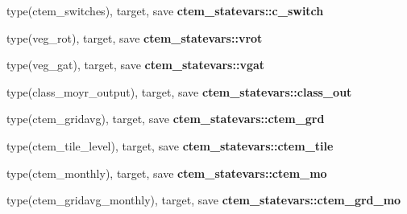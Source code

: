 \begin{DoxyCompactItemize}
\item 
\hypertarget{namespacectem__statevars_ae5b8eaa631db6fcf2adc586a8ffdb722}{}type(ctem\+\_\+switches), target, save {\bfseries ctem\+\_\+statevars\+::c\+\_\+switch}\label{namespacectem__statevars_ae5b8eaa631db6fcf2adc586a8ffdb722}

\item 
\hypertarget{namespacectem__statevars_ac60177625fa0d946b94065134b1f37a2}{}type(veg\+\_\+rot), target, save {\bfseries ctem\+\_\+statevars\+::vrot}\label{namespacectem__statevars_ac60177625fa0d946b94065134b1f37a2}

\item 
\hypertarget{namespacectem__statevars_ae21be54e6097f1f897ddbb5a7265d301}{}type(veg\+\_\+gat), target, save {\bfseries ctem\+\_\+statevars\+::vgat}\label{namespacectem__statevars_ae21be54e6097f1f897ddbb5a7265d301}

\item 
\hypertarget{namespacectem__statevars_a1b383361faf075e17b8f4376d478f469}{}type(class\+\_\+moyr\+\_\+output), target, save {\bfseries ctem\+\_\+statevars\+::class\+\_\+out}\label{namespacectem__statevars_a1b383361faf075e17b8f4376d478f469}

\item 
\hypertarget{namespacectem__statevars_ab8cd13b4bb2133f86012aa72a85253de}{}type(ctem\+\_\+gridavg), target, save {\bfseries ctem\+\_\+statevars\+::ctem\+\_\+grd}\label{namespacectem__statevars_ab8cd13b4bb2133f86012aa72a85253de}

\item 
\hypertarget{namespacectem__statevars_a35e3e81a8d12b67b5bc48767779ffe4d}{}type(ctem\+\_\+tile\+\_\+level), target, save {\bfseries ctem\+\_\+statevars\+::ctem\+\_\+tile}\label{namespacectem__statevars_a35e3e81a8d12b67b5bc48767779ffe4d}

\item 
\hypertarget{namespacectem__statevars_a1935b531e4ef11e55fdaf77f816c9269}{}type(ctem\+\_\+monthly), target, save {\bfseries ctem\+\_\+statevars\+::ctem\+\_\+mo}\label{namespacectem__statevars_a1935b531e4ef11e55fdaf77f816c9269}

\item 
\hypertarget{namespacectem__statevars_a0e6e53463d563093cfacf19a1358ec1c}{}type(ctem\+\_\+gridavg\+\_\+monthly), target, save {\bfseries ctem\+\_\+statevars\+::ctem\+\_\+grd\+\_\+mo}\label{namespacectem__statevars_a0e6e53463d563093cfacf19a1358ec1c}


\end{DoxyCompactItemize}
